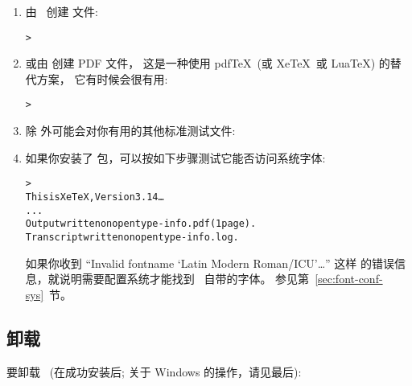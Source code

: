 \documentclass{article}
\begin{document}
\begin{enumerate}
\item 由 \dvi\ 创建 \PS{} 文件: 
\begin{alltt}
> 
\end{alltt}

\item 或由 \dvi{} 创建 PDF 文件，
这是一种使用 pdf\TeX\ (或 Xe\TeX\ 或 Lua\TeX) 的替代方案，
它有时候会很有用: 
\begin{alltt}
> 
\end{alltt}

\item 除  外可能会对你有用的其他标准测试文件: 


\item 如果你安装了  包，可以按如下步骤测试它能否访问系统字体: 
\begin{alltt}
> 
This is XeTeX, Version 3.14\dots
...
Output written on opentype-info.pdf (1 page).
Transcript written on opentype-info.log.
\end{alltt}

如果你收到 ``Invalid fontname `Latin Modern Roman/ICU'\dots'' 这样
的错误信息，就说明需要配置系统才能找到 \TL\ 自带的字体。
参见第~\ref{sec:font-conf-sys}~节。

\end{enumerate}

\subsection{卸载 \TL}
\label{sec:uninstall}

要卸载 \TL\ (在成功安装后; 关于 Windows 的操作，请见最后): 
\end{document}
